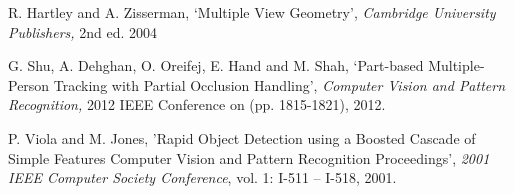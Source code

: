 \documentclass[conference]{IEEEtran}
\begin{document}
\begin{thebibliography}{1}
R. Hartley and A. Zisserman, ‘Multiple View Geometry’, \textit{Cambridge University Publishers,} 2nd ed. 2004

G. Shu, A. Dehghan, O. Oreifej, E. Hand and M. Shah, ‘Part-based Multiple-Person Tracking with Partial Occlusion Handling’, \textit{Computer Vision and Pattern Recognition,} 2012 IEEE Conference on (pp. 1815-1821), 2012.

P. Viola and M. Jones, 'Rapid Object Detection using a Boosted Cascade of Simple Features Computer Vision and Pattern Recognition Proceedings', \textit{2001 IEEE Computer Society Conference}, vol. 1: I-511 – I-518, 2001.

\end{thebibliography}
 
\end{document}
